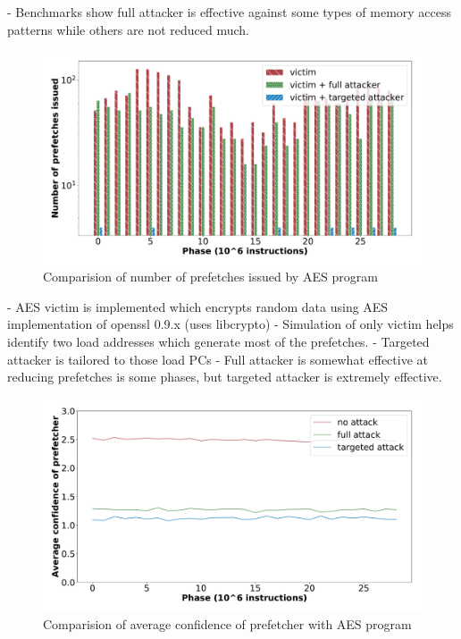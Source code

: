 \documentclass[conference]{IEEEtran}
\begin{document}
 - Benchmarks show full attacker is effective against some types of memory access
   patterns while others are not reduced much.

\begin{figure}[htbp]
    \centering
    \includegraphics[width=\columnwidth]{pf_issued}
    \caption{Comparision of number of prefetches issued by AES program}
    \label{fig:targeted_attack}
\end{figure}

 - AES victim is implemented which encrypts random data using AES implementation
   of openssl 0.9.x (uses libcrypto)
 - Simulation of only victim helps identify two load addresses which generate
   most of the prefetches.
 - Targeted attacker is tailored to those load PCs
 - Full attacker is somewhat effective at reducing prefetches is some phases,
   but targeted attacker is extremely effective.

\begin{figure}[htbp]
    \centering
    \includegraphics[width=\columnwidth]{avg_conf}
    \caption{Comparision of average confidence of prefetcher with AES program}
    \label{fig:targeted_avgconf}
\end{figure}
\end{document}
